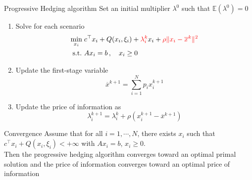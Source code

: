 \begin{frame}{Progressive Hedging algorithm}
Set an initial multiplier $\lambda^0$ such that $\mathbb{E}(\lambda^0) = 0$
  \begin{enumerate}
    \item Solve for each scenario
      \begin{equation*}
        \begin{aligned}
          \min_{x_i} \; & c^\top x_i + Q(x_i, \xi_i) + {\color{red}\lambda_i^k}x_i + {\color{red}\rho \|x_i - \overline{x}^k \|^2 }\\
          \mbox{s.t.}~ & A x_i = b\, , \quad x_i \geq 0
        \end{aligned}
      \end{equation*}
    \item Update the first-stage variable
      \begin{equation*}
        \overline{x}^{k+1} = \sum_{i=1}^N p_i x_i^{k+1}
      \end{equation*}
    \item Update the price of information as
      \begin{equation*}
        \lambda^{k+1}_i = \lambda^k_i + \rho (x_i^{k+1} - \overline{x}^{k+1})
      \end{equation*}
  \end{enumerate}

  \begin{block}{Convergence}
    Assume that for all $i=1, \cdots, N$, there exists $x_i$ such that $c^\top x_i + Q(x_i, \xi_i) < +\infty$
    with $Ax_i = b$, $x_i \geq 0$. \\
    Then the progressive hedging algorithm converges toward an optimal primal solution
    and the price of information converges toward an optimal price of information
  \end{block}

\end{frame}


